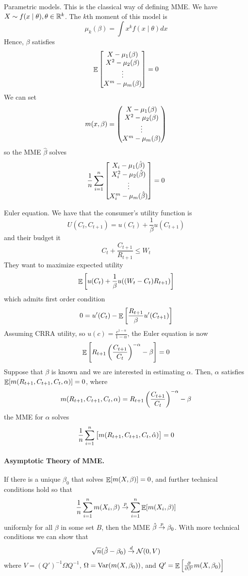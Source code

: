 \documentclass[10pt]{article}
\begin{document}
\begin{example}
	Parametric models. This is the classical way of defining MME. We have $X \sim f(x\mid \theta),\theta \in \mathbb{R}^k$. The $k$th moment of this model is
	\[
	\mu_k(\beta) = \int x^k f(x \mid \theta) dx
	\]
	Hence, $\beta$ satisfies
	\[
	\mathop{\mathbb{E}} \begin{bmatrix}X - \mu_1(\beta) \\ X^2 - \mu_2(\beta) \\ \vdots \\ X^m - \mu_m(\beta)\end{bmatrix} = 0
	\]
	We can set
	\[
	m(x,\beta) = \begin{pmatrix}X - \mu_1(\beta) \\ X^2 - \mu_2(\beta) \\ \vdots \\ X^m - \mu_m(\beta)\end{pmatrix}
	\]
	so the MME $\hat{\beta}$ solves
	\[
	\frac{1}{n}\sum_{i=1}^n \begin{bmatrix}X_i - \mu_1(\hat{\beta}) \\ X^2_i - \mu_2(\hat{\beta}) \\ \vdots \\ X^m_i - \mu_m(\hat{\beta})\end{bmatrix}  = 0
	\]
\end{example}

\begin{example}
	Euler equation. We have that the consumer's utility function is
	\[
	U(C_t,C_{t+1}) = u(C_t) + \frac{1}{\beta} u(C_{t+1})
	\]
	and their budget it
	\[
	C_t + \frac{C_{t+1}}{R_{t+1}	} \le W_t
	\]
	They want to maximize expected utility
	\[
	\mathop{\mathbb{E}}\left[ u(C_t) + \frac{1}{\beta} u((W_t - C_t)R_{t+1})\right]
	\]
	which admits first order condition
	\[
	0 = u'(C_t) - \mathop{\mathbb{E}}\left[ \frac{R_{t+1}}{\beta} u'(C_{t+1})\right]
	\]
	Assuming CRRA utility, so $u(c) = \frac{c^{1-\alpha}}{1-\alpha}$, the Euler equation is now
	\[
	\mathop{\mathbb{E}}\left[ R_{t+1} \left( \frac{C_{t+1}}{C_t}\right)^{-\alpha} - \beta \right] = 0
	\]
	Suppose that $\beta$ is known and we are interested in estimating $\alpha$. Then, $\alpha$ satisfies $\mathop{\mathbb{E}}[m(R_{t+1},C_{t+1},C_t,\alpha)] = 0$, where
	\[
	m(R_{t+1},C_{t+1},C_t,\alpha) = R_{t+1} \left( \frac{C_{t+1}}{C_t}\right)^{-\alpha} - \beta
	\]
	the MME for $\alpha$ solves
	\[
	\frac{1}{n} \sum_{i=1}^n \begin{bmatrix}m(R_{t+1},C_{t+1},C_t,\hat{\alpha})\end{bmatrix} = 0
	\]
\end{example}

\paragraph{Asymptotic Theory of MME.} If there is a unique $\beta_0$ that solves $\mathop{\mathbb{E}}[m(X,\beta)] = 0$, and further technical conditions hold so that 
\[
\frac{1}{n}\sum_{i=1}^n m(X_i,\beta) \overset{p}{\to} \sum_{i=1}^n \mathop{\mathbb{E}}[m(X_i,\beta)]
\]
uniformly for all $\beta$ in some set $B$, then the MME $\hat{\beta} \overset{p}{\to} \beta_0$. With more technical conditions we can show that
\[
\sqrt{n}(\hat{\beta} - \beta_0) \overset{d}{\to} \mathcal{N}(0,V)
\]
where $V = (Q')^{-1}\Omega Q^{-1}$, $\Omega = \mathop{\rm Var}(m(X,\beta_0))$, and $Q' = \mathop{\mathbb{E}}\left[ \frac{\partial}{\partial \beta'} m(X,\beta_0) \right]$
\end{document}
